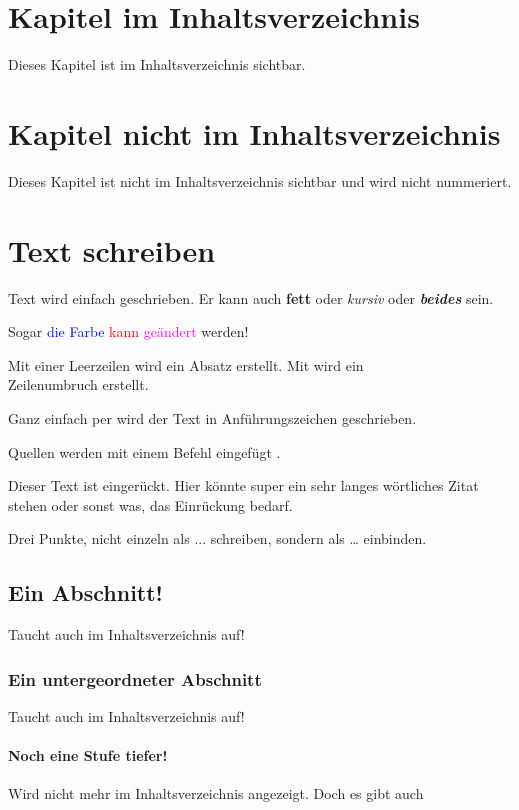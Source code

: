 \chapter{Kapitel im Inhaltsverzeichnis}
Dieses Kapitel ist im Inhaltsverzeichnis sichtbar.

\chapter*{Kapitel nicht im Inhaltsverzeichnis}
Dieses Kapitel ist nicht im Inhaltsverzeichnis sichtbar und wird nicht nummeriert.

\chapter{Text schreiben}
Text wird einfach geschrieben.
Er kann auch \textbf{fett} oder \textit{kursiv} oder \textit{\textbf{beides}} sein.

Sogar \textcolor{blue}{die Farbe} \textcolor{red}{kann} \textcolor{magenta}{geändert} werden!

Mit einer Leerzeilen wird ein Absatz erstellt.
Mit \anfz{\textbackslash\textbackslash} wird ein\\
Zeilenumbruch erstellt.

Ganz einfach per  wird der Text in Anführungszeichen geschrieben.

Quellen werden mit einem  Befehl eingefügt \cite{Tietze2010}.

\begin{addmargin}[2em]{0pt}
    Dieser Text ist eingerückt. Hier könnte super ein sehr langes wörtliches Zitat stehen oder sonst was, das Einrückung bedarf.
\end{addmargin}

Drei Punkte, nicht einzeln als ... schreiben, sondern als \dots{} einbinden.

\section{Ein Abschnitt!}
Taucht auch im Inhaltsverzeichnis auf!
\subsection{Ein untergeordneter Abschnitt}
Taucht auch im Inhaltsverzeichnis auf!
\subsubsection{Noch eine Stufe tiefer!}
Wird nicht mehr im Inhaltsverzeichnis angezeigt.
Doch es gibt auch
